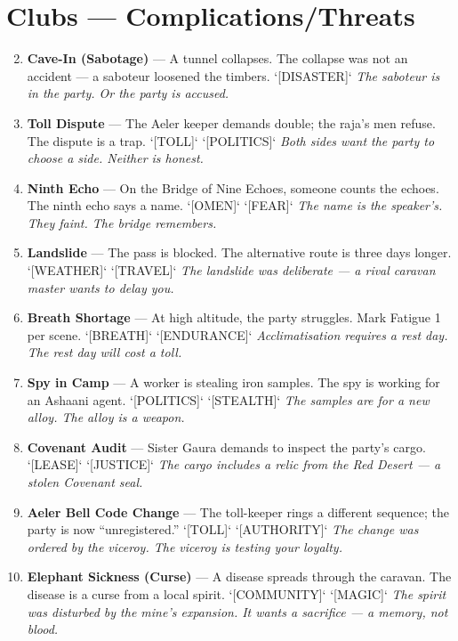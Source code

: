 \section*{Clubs --- Complications/Threats}
\label{sec:satrapies-complications}
\begin{enumerate}
\setcounter{enumi}{1}
\item \textbf{Cave-In (Sabotage)} --- A tunnel collapses. The collapse was not an accident — a saboteur loosened the timbers. `[DISASTER]`
  \hfill \textit{The saboteur is in the party. Or the party is accused.}
\item \textbf{Toll Dispute} --- The Aeler keeper demands double; the raja's men refuse. The dispute is a trap. `[TOLL]` `[POLITICS]`
  \hfill \textit{Both sides want the party to choose a side. Neither is honest.}
\item \textbf{Ninth Echo} --- On the Bridge of Nine Echoes, someone counts the echoes. The ninth echo says a name. `[OMEN]` `[FEAR]`
  \hfill \textit{The name is the speaker's. They faint. The bridge remembers.}
\item \textbf{Landslide} --- The pass is blocked. The alternative route is three days longer. `[WEATHER]` `[TRAVEL]`
  \hfill \textit{The landslide was deliberate — a rival caravan master wants to delay you.}
\item \textbf{Breath Shortage} --- At high altitude, the party struggles. Mark Fatigue 1 per scene. `[BREATH]` `[ENDURANCE]`
  \hfill \textit{Acclimatisation requires a rest day. The rest day will cost a toll.}
\item \textbf{Spy in Camp} --- A worker is stealing iron samples. The spy is working for an Ashaani agent. `[POLITICS]` `[STEALTH]`
  \hfill \textit{The samples are for a new alloy. The alloy is a weapon.}
\item \textbf{Covenant Audit} --- Sister Gaura demands to inspect the party's cargo. `[LEASE]` `[JUSTICE]`
  \hfill \textit{The cargo includes a relic from the Red Desert — a stolen Covenant seal.}
\item \textbf{Aeler Bell Code Change} --- The toll-keeper rings a different sequence; the party is now ``unregistered.'' `[TOLL]` `[AUTHORITY]`
  \hfill \textit{The change was ordered by the viceroy. The viceroy is testing your loyalty.}
\item \textbf{Elephant Sickness (Curse)} --- A disease spreads through the caravan. The disease is a curse from a local spirit. `[COMMUNITY]` `[MAGIC]`
  \hfill \textit{The spirit was disturbed by the mine's expansion. It wants a sacrifice — a memory, not blood.}

\end{enumerate}
